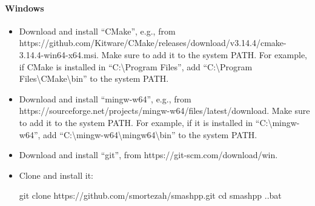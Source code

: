 \paragraph{Windows}
\begin{itemize}
  \item Download and install ``CMake'', e.g., from https://github.com/Kitware/CMake/releases/\linebreak download/v3.14.4/cmake-3.14.4-win64-x64.msi. Make sure to add it to the system PATH. For example, if CMake is installed in ``C:\textbackslash Program Files'', add ``C:\textbackslash Program Files\textbackslash CMake\textbackslash bin'' to the system PATH.
  \item Download and install ``mingw-w64'', e.g., from https://sourceforge.net/projects/mingw-w64/\linebreak files/latest/download. Make sure to add it to the system PATH. For example, if it is installed in ``C:\textbackslash mingw-w64'', add ``C:\textbackslash mingw-w64\textbackslash mingw64\textbackslash bin'' to the system PATH.
  \item Download and install ``git'', from https://git-scm.com/download/win.
  \item Clone \smashpp and install it:
\begin{code}[style=bash]
git clone https://github.com/smortezah/smashpp.git
cd smashpp
.\install.bat
\end{code}
\end{itemize}

